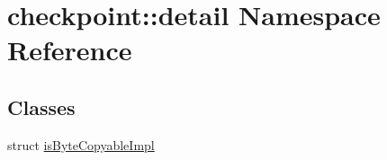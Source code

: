 \hypertarget{namespacecheckpoint_1_1detail}{}\section{checkpoint\+:\+:detail Namespace Reference}
\label{namespacecheckpoint_1_1detail}
\subsection*{Classes}
\begin{DoxyCompactItemize}
\item 
struct \hyperlink{structcheckpoint_1_1detail_1_1is_byte_copyable_impl}{is\+Byte\+Copyable\+Impl}
\end{DoxyCompactItemize}
